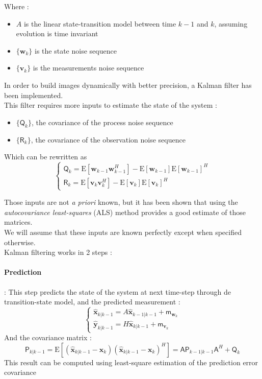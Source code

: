 \documentclass[titlepage,11pt]{article}
\newcommand{\moy}[1]{\boldsymbol{\mathsf{m}}_{#1}}
\newcommand{\autocorr}[1]{\expval{(#1)(#1)^H}}
\renewcommand{\expval}[1]{\text{E}\left[#1\right]}
\newcommand{\w}{\boldsymbol{w}}
\renewcommand{\v}{\boldsymbol{v}}
\newcommand{\Q}{\boldsymbol{\mathsf{Q}}}
\newcommand{\R}{\boldsymbol{\mathsf{R}}}
\newcommand{\A}{\boldsymbol{\mathsf{A}}}
\newcommand{\x}{\boldsymbol{x}}
\newcommand{\y}{\boldsymbol{y}}
\newcommand{\xp}{\widehat{\x}_{k|k-1}}
\newcommand{\xa}{\widehat{\x}_{k-1|k-1}}
\newcommand{\yp}{\widehat{\y}_{k|k-1}}
\newcommand{\Pp}{\boldsymbol{\mathsf{P}}_{k|k-1}}
\newcommand{\Pa}{\boldsymbol{\mathsf{P}}_{k-1|k-1}}
\begin{document}
	Where :
	\begin{itemize}
		\item $A$ is the linear state-transition model between time $k-1$ and $k$, assuming evolution is time invariant
		\item $\{\w_k\}$ is the state noise sequence
		\item $\{\v_k\}$ is the measurements noise sequence
	\end{itemize}
	
		
	In order to build images dynamically with better precision, a Kalman filter has been implemented.\\
	
	This filter requires more inputs to estimate the state of the system :
	\begin{itemize}
		\item $\{\Q_k\}$, the covariance of the process noise sequence
		\item $\{\R_k\}$, the covariance of the observation noise sequence
	\end{itemize}

	Which can be rewritten as
	$$
		\begin{cases}
			\Q_k = \expval{\w_{k-1}\w_{k-1}^H} - \expval{\w_{k-1}}\expval{\w_{k-1}}^H \\
			\R_k = \expval{\v_{k}\v_{k}^H} - \expval{\v_k}\expval{\v_k}^H 
		\end{cases}
	$$
	
	Those inputs are not \emph{a priori} known, but it has been shown that using the \emph{autocovariance least-squares} (ALS) method provides a good estimate of those matrices. \cite{ALS} \\
	We will assume that these inputs are known perfectly except when specified otherwise.\\
	
	Kalman filtering works in 2 steps :
	\paragraph{Prediction} : This step predicts the state of the system at next time-step through de transition-state model, and the predicted measurement :
	$$
	\begin{cases}
		\xp = A\xa + \moy{\w_k}\\
		\yp = H\xp + \moy{\v_k}
	\end{cases}
	$$
	And the covariance matrix :
	$$
		\Pp = \autocorr{\xp - \x_k} = \A\Pa \A^H + \Q_k
	$$
	This result can be computed using least-square estimation of the prediction error covariance\cite{intro_KF}
	
\end{document}
